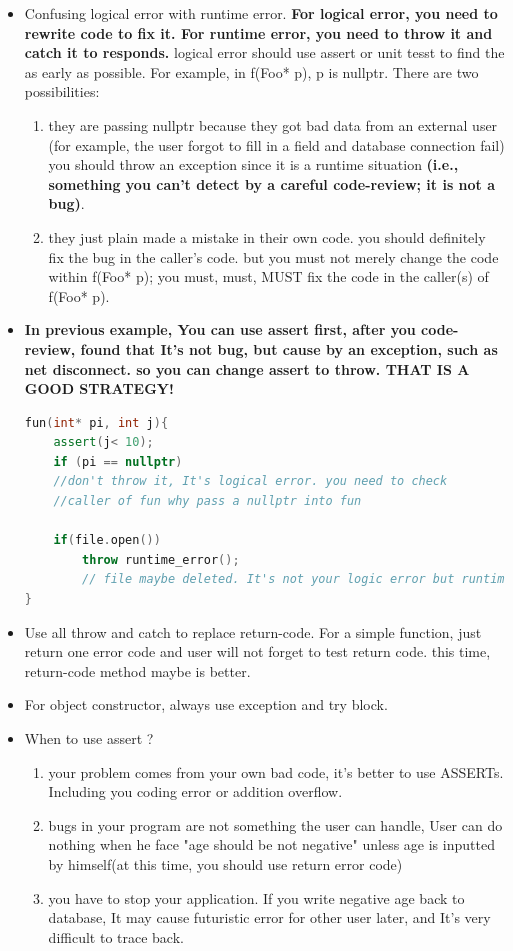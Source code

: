 \documentclass[a4paper,11pt,twoside]{book}
\begin{document}
\begin{itemize}
	\item Confusing logical error with runtime error. \textbf{For logical error, you need to rewrite code to fix it. For runtime error, you need to throw it and catch it to responds. } logical error should use assert  or unit tesst to find the as early as possible. For example, in f(Foo* p), p is nullptr. There are two possibilities:
	\begin{enumerate}
		\item they are passing nullptr because they got bad data from an external user (for example, the user forgot to fill in a field and database connection fail) you should throw an exception since it is a runtime situation \textbf{(i.e., something you can't detect by a careful code-review; it is not a bug)}.
		\item they just plain made a mistake in their own code. you should definitely fix the bug in the caller's code. but you must not merely change the code within f(Foo* p); you must, must, MUST fix the code in the caller(s) of f(Foo* p).
	\end{enumerate}
	\item \textbf{ In previous example, You can use assert first, after you code-review, found that It's not bug, but cause by an exception, such as net disconnect. so you can change assert to throw. THAT IS  A GOOD STRATEGY!}
	
\begin{lstlisting}[frame=single, language=c++]
fun(int* pi, int j){
	assert(j< 10);
	if (pi == nullptr)
	//don't throw it, It's logical error. you need to check 
	//caller of fun why pass a nullptr into fun
	
	if(file.open())
		throw runtime_error();
		// file maybe deleted. It's not your logic error but runtime error.
}
	\end{lstlisting}
	\item Use all throw and catch to replace return-code. For a simple function, just return one error code and user will not forget to test return code. this time, return-code method maybe is better.
	
	\item For object constructor, always use exception and try block.
	
	\item When to use assert ?
	\begin{enumerate}
		\item your problem comes from your own bad code, it's better to use ASSERTs.  Including you coding error or addition overflow.
		\item bugs in your program are not something the user can handle, User can do nothing when he face "age should be not negative" unless age is inputted by himself(at this time, you should use return error code)
		\item you have to stop your application. If you write negative age back to database, It may cause futuristic error for other user later, and It's very difficult to trace back.
	\end{enumerate}
	

\end{itemize}
\end{document}
